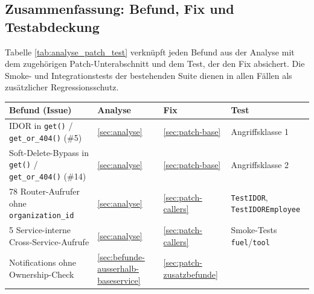 \subsection{Zusammenfassung: Befund, Fix und Testabdeckung}
\label{sec:patch-uebersicht}

Tabelle \ref{tab:analyse_patch_test} verknüpft jeden Befund aus der
Analyse mit dem zugehörigen Patch-Unterabschnitt und dem Test, der den
Fix absichert. Die Smoke- und Integrationstests der bestehenden Suite
dienen in allen Fällen als zusätzlicher Regressionsschutz.

\begin{table}[H]
      \begin{center}
            \renewcommand{\arraystretch}{1.3}
            \begin{tabular}{|p{4.8cm}|l|l|p{3.8cm}|}
                  \hline
                  \textbf{Befund (Issue)}
                   & \textbf{Analyse}
                   & \textbf{Fix}
                   & \textbf{Test}                                                                                   \\
                  \hline
                  IDOR in \texttt{get()} / \texttt{get\_or\_404()} (\#5)
                   & \ref{sec:analyse}
                   & \ref{sec:patch-base}
                   & Angriffsklasse 1                                                                                \\
                  Soft-Delete-Bypass in \texttt{get()} / \texttt{get\_or\_404()} (\#14)
                   & \ref{sec:analyse}
                   & \ref{sec:patch-base}
                   & Angriffsklasse 2                                                                                \\
                  78 Router-Aufrufer ohne \texttt{organization\_id}
                   & \ref{sec:analyse}
                   & \ref{sec:patch-callers}
                   & \texttt{TestIDOR}, \texttt{TestIDOREmployee}                                                    \\
                  5 Service-interne Cross-Service-Aufrufe
                   & \ref{sec:analyse}
                   & \ref{sec:patch-callers}
                   & Smoke-Tests \texttt{fuel}/\texttt{tool}                                                         \\
                  Notifications ohne Ownership-Check
                   & \ref{sec:befunde-ausserhalb-baseservice}
                   & \ref{sec:patch-zusatzbefunde}

\end{tabular}
\end{center}
\end{table}
